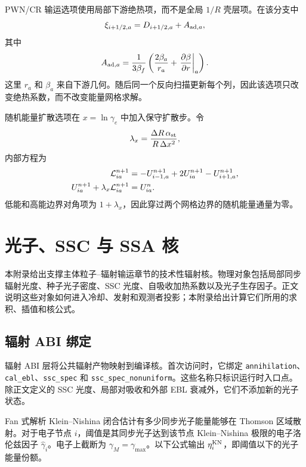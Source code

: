 \documentclass[twocolumn]{aastex702}
\begin{document}
PWN/CR 输运选项使用局部下游绝热项，而不是全局 \(1/R\) 壳层项。在该分支中
\begin{equation}
\xi_{i+1/2,a}=D_{i+1/2,a}+A_{{\rm ad},a},
\end{equation}
其中
\begin{equation}
A_{{\rm ad},a}=
\frac{1}{3\beta_f}
\left(
\frac{2\beta_a}{r_a}
+\left.\frac{\partial\beta}{\partial r}\right|_a
\right).
\end{equation}
这里 \(r_a\) 和 \(\beta_a\) 来自下游几何。随后同一个反向扫描更新每个列，因此该选项只改变绝热系数，而不改变能量网格求解。

随机能量扩散选项在 \(x=\ln\gamma_e\) 中加入保守扩散步。令
\begin{equation}
\lambda_x=\frac{\Delta R\,\alpha_{\rm st}}{R\,\Delta x^2},
\end{equation}
内部方程为
\begin{equation}
\begin{aligned}
{\cal L}_{ia}^{n+1}
&=-U_{i-1,a}^{n+1}+2U_{ia}^{n+1}-U_{i+1,a}^{n+1},\\
U_{ia}^{n+1}+\lambda_x{\cal L}_{ia}^{n+1}
&=U_{ia}^{n}.
\end{aligned}
\end{equation}
低能和高能边界对角项为 \(1+\lambda_x\)，因此穿过两个网格边界的随机能量通量为零。

\section{光子、SSC 与 SSA 核} \label{app:photon-kernels}

本附录给出支撑主体粒子--辐射输运章节的技术性辐射核。物理对象包括局部同步辐射光度、种子光子密度、SSC 光度、自吸收加热系数以及光子生存因子。正文说明这些对象如何进入冷却、发射和观测者投影；本附录给出计算它们所用的求积、插值和核公式。

\subsection{辐射 ABI 绑定}

辐射 ABI 层将公共辐射产物映射到编译核。首次访问时，它绑定 \texttt{annihilation}、\texttt{cal\_ebl}、\texttt{ssc\_spec} 和 \texttt{ssc\_spec\_nonuniform}。这些名称只标识运行时入口点。除正文定义的 SSC 光度、局部对吸收和外部 EBL 衰减外，它们不添加新的光子状态。

Fan 式解析 Klein--Nishina 闭合估计有多少同步光子能量能够在 Thomson 区域散射。对于电子节点 \(i\)，阈值是其同步光子达到该节点 Klein--Nishina 极限的电子洛伦兹因子 \(\hat\gamma_i\)。电子上截断为 \(\gamma_M=\gamma_{\max}\)。以下公式输出 \(\eta_i^{\rm KN}\)，即阈值以下的光子能量份额。
\end{document}
